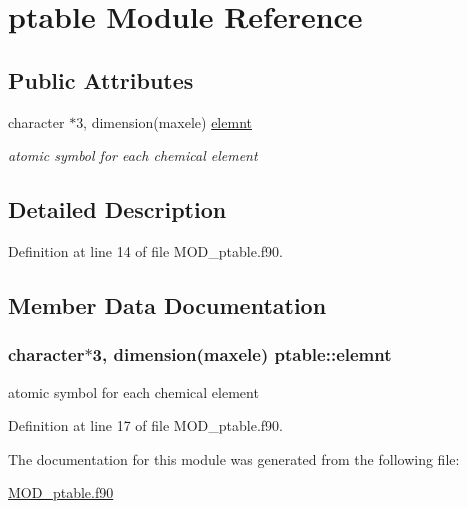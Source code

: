 \hypertarget{classptable}{\section{ptable Module Reference}
\label{classptable}
}
\subsection*{Public Attributes}
\begin{DoxyCompactItemize}
\item 
character $\ast$3, dimension(maxele) \hyperlink{classptable_a792dcc0a9361ea89b1e076d0193050de}{elemnt}
\begin{DoxyCompactList}\small\item\em atomic symbol for each chemical element \end{DoxyCompactList}\end{DoxyCompactItemize}


\subsection{Detailed Description}


Definition at line 14 of file M\-O\-D\-\_\-ptable.\-f90.



\subsection{Member Data Documentation}
\hypertarget{classptable_a792dcc0a9361ea89b1e076d0193050de}{
\subsubsection[{elemnt}]{\setlength{\rightskip}{0pt plus 5cm}character$\ast$3, dimension(maxele) ptable\-::elemnt}}\label{classptable_a792dcc0a9361ea89b1e076d0193050de}


atomic symbol for each chemical element 



Definition at line 17 of file M\-O\-D\-\_\-ptable.\-f90.



The documentation for this module was generated from the following file\-:\begin{DoxyCompactItemize}
\item 
\hyperlink{MOD__ptable_8f90}{M\-O\-D\-\_\-ptable.\-f90}\end{DoxyCompactItemize}
